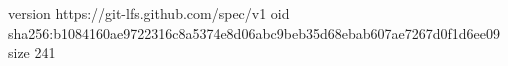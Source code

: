 version https://git-lfs.github.com/spec/v1
oid sha256:b1084160ae9722316c8a5374e8d06abc9beb35d68ebab607ae7267d0f1d6ee09
size 241
